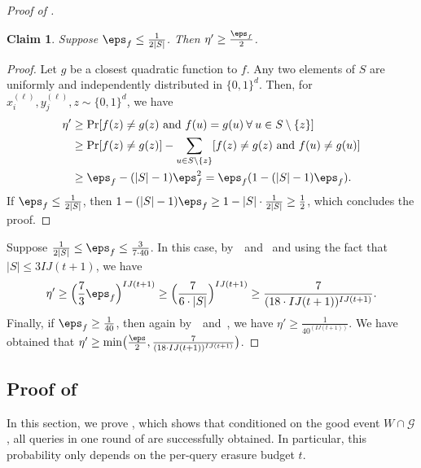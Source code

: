 \documentclass[11pt]{article}
\numberwithin{equation}{section}
\newtheorem{claim}[theorem]{Claim}
\theoremstyle{definition}
\theoremstyle{plain}
\begin{document}
\begin{proof}[Proof of ]
 \begin{claim} \label{clm:small_eps}
 Suppose $\eps_f \leq \frac{1}{2|S|}$. Then $\eta' \geq \frac{\eps_f}{2}$.
 \end{claim}
 \begin{proof}
 Let $g$ be a closest quadratic function to $f$. Any two elements of $S$ are uniformly and independently distributed in $\{0,1\}^d$. Then, for $x_i^{(\ell)}, y_j^{(\ell)}, z \sim \{0,1\}^d$, we have
 \begin{align*}
     \eta' &\geq \Pr[f(z) \neq g(z) \text{ and } f(u) = g(u) \:\forall\: u \in S\setminus \{z\}] \\
     &\geq \Pr[f(z) \neq g(z)] - \sum_{u \in S\setminus\{z\}}[f(z) \neq g(z) \text{ and } f(u) \neq g(u)] \\
     &\geq \eps_f - (|S|-1)\eps_f^2 = \eps_f(1 - (|S|-1)\eps_f).
 \end{align*}
 If $\eps_f \leq \frac{1}{2|S|}$, then $1 - (|S|-1)\eps_f \geq 1 - |S| \cdot \frac{1}{2|S|} \geq \frac{1}{2}$, which concludes the proof. 
 \end{proof}
 
 Suppose $\frac{1}{2|S|} \leq \eps_f \leq \frac{3}{7\cdot 40}$. In this case, by~~and~ and using the fact that $|S| \leq 3IJ(t+1)$, we have 
 \begin{align*}
 \eta' \geq \Big(\frac{7}{3}\eps_f\Big)^{IJ(t+1)} \geq \Big(\frac{7}{6\cdot |S|}\Big)^{IJ(t+1)} \geq  \frac{7}{(18  \cdot IJ(t+1))^{IJ(t+1)}}.
 \end{align*}
 Finally, if $\eps_f \geq \frac{1}{40}$, then again by~~and~, we have $\eta' \geq \frac{1}{40^{(IJ(t+1))}}$. We have obtained that $\eta' \geq \min \bigl( \frac{\eps}{2}, \frac{7}{(18 \cdot IJ(t+1))^{I J (t+1)}} \bigr)$. 
\end{proof}
 

\subsection{Proof of } \label{sec:lem_erasures}

In this section, we prove , which shows that conditioned on the good event $W \cap \mathcal{G}$, all queries in one round of  are successfully obtained. In particular, this probability only depends on the per-query erasure budget $t$. 
\end{document}
